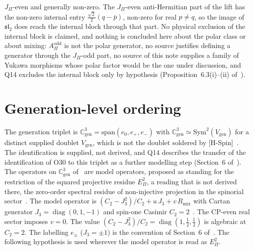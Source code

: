 \documentclass[11pt]{article}
\theoremstyle{definition}
\theoremstyle{remark}
\newcommand{\JPi}{J_{\Pi}}
\newcommand{\AOdd}{A_{\Pi}^{\mathrm{odd}}}
\newcommand{\Jthree}{J_{3}}
\newcommand{\Rmix}{R_{\mathrm{mix}}}
\newcommand{\Cgen}{\mathbb{C}^{3}_{\mathrm{gen}}}
\newcommand{\Epi}{E_{\Pi}}
\newcommand{\Sym}{\mathrm{Sym}}
\newcommand{\diag}{\operatorname{diag}}
\begin{document}
    $\JPi$-even and generally non-zero.
    The $\JPi$-even anti-Hermitian part of the lift has the non-zero internal entry $\tfrac{\sqrt{2}}{2}(q -
    \bar{p})$, non-zero for real $p \neq q$, so the image of $\mathfrak{sl}_{2}$ does reach the internal block through
    that part.
    No physical exclusion of the internal block is claimed, and nothing is concluded here about the polar class or
    about mixing: $\AOdd$ is not the polar generator, no source justifies defining a generator through the
    $\JPi$-odd part, no source of this note supplies a family of Yukawa morphisms whose polar factor would be the
    one under discussion, and Q14 excludes the internal block only by hypothesis (Proposition~6.3(i)--(ii)
    of~\cite{Beau2026q14}).

  \section{Generation-level ordering}
    \label{sec:levels}

    The generation triplet is $\Cgen = \mathrm{span}(e_{0}, e_{+}, e_{-})$ with
    $\Cgen \simeq \Sym^{2}(V_{\mathrm{gen}})$
    for a distinct supplied doublet $V_{\mathrm{gen}}$, which is not the doublet soldered by
    [H-Spin]~\cite{Beau2026q14}.
    The identification is supplied, not derived, and Q14 describes the transfer of the identification of O30 to this
    triplet as a further modelling step (Section~6 of~\cite{Beau2026q14}).
    The operators on $\Cgen$ of~\cite{Beau2026q14} are model operators, proposed as standing for the restriction of the
    squared projective residue $\Epi^{2}$, a reading that is not derived there, the zero-order spectral residue of non-injective projection in the spinorial
    sector~\cite{Beau2026q14}.
    The model operator is $(C_{2} - \Jthree^{2})/C_{2} + u\,\Jthree + v\,\Rmix$ with Cartan generator
    $\Jthree = \diag(0, 1, -1)$ and spin-one Casimir $C_{2} = 2$~\cite{Beau2026prs}.
    The CP-even real sector imposes $v = 0$.
    The value $(C_{2} - \Jthree^{2})/C_{2} = \diag(1, \tfrac12, \tfrac12)$ is algebraic at
    $C_{2} = 2$.
    The labelling $e_{\pm}$ ($\Jthree = \pm 1$) is the convention of Section~6 of~\cite{Beau2026q14}.
    The following hypothesis is used wherever the model operator is read as $\Epi^{2}$.
\end{document}
